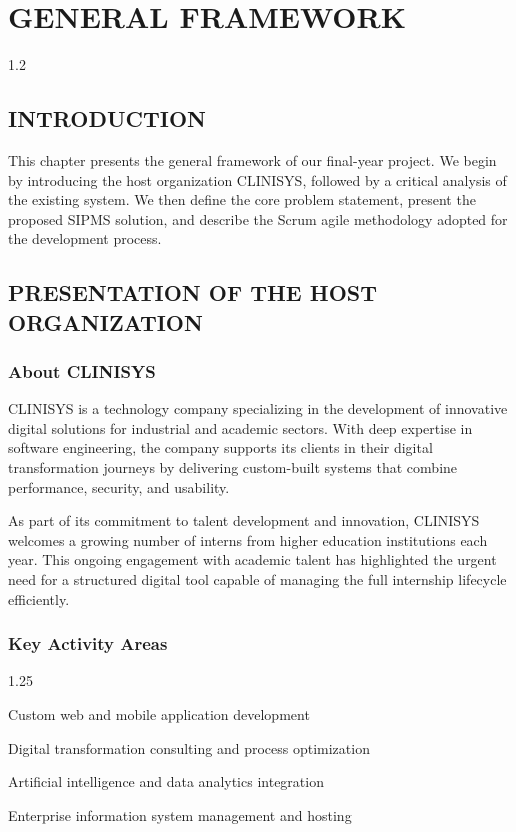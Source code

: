 \chapter{GENERAL FRAMEWORK}
\begin{spacing}{1.2}
\minitoc
\thispagestyle{MyStyle}
\end{spacing}
\newpage

\section{INTRODUCTION}
This chapter presents the general framework of our final-year project. We begin by introducing the host organization CLINISYS, followed by a critical analysis of the existing system. We then define the core problem statement, present the proposed SIPMS solution, and describe the Scrum agile methodology adopted for the development process.

\section{PRESENTATION OF THE HOST ORGANIZATION}

\subsection{About CLINISYS}
CLINISYS is a technology company specializing in the development of innovative digital solutions for industrial and academic sectors. With deep expertise in software engineering, the company supports its clients in their digital transformation journeys by delivering custom-built systems that combine performance, security, and usability.

\par
As part of its commitment to talent development and innovation, CLINISYS welcomes a growing number of interns from higher education institutions each year. This ongoing engagement with academic talent has highlighted the urgent need for a structured digital tool capable of managing the full internship lifecycle efficiently.

\subsection{Key Activity Areas}
\renewcommand{\labelitemi}{\tiny$\bullet$}
\begin{itemize}[leftmargin=2cm, topsep=0pt]
    \begin{spacing}{1.25}
        \item Custom web and mobile application development
        \item Digital transformation consulting and process optimization
        \item Artificial intelligence and data analytics integration
        \item Enterprise information system management and hosting
    \end{spacing}
\end{itemize}

